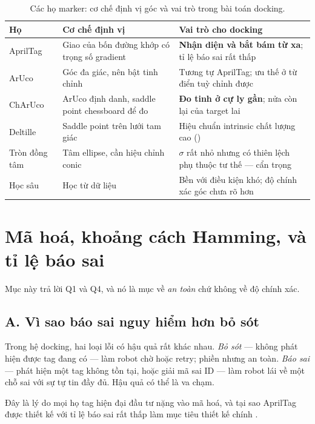 \documentclass[../../marker.tex]{subfiles}
\begin{document}
\begin{table}[H]\centering\small
\caption{Các họ marker: cơ chế định vị góc và vai trò trong bài toán docking.}
\label{tab:b07-ho}
\begin{tabularx}{\linewidth}{@{}L{2.2cm}L{3.6cm}Y@{}}
\toprule
\textbf{Họ} & \textbf{Cơ chế định vị} & \textbf{Vai trò cho docking}\\
\midrule
AprilTag & Giao của bốn đường khớp có trọng số gradient \cite{wang2016apriltag2} & \textbf{Nhận diện và bắt bám từ xa}; tỉ lệ báo sai rất thấp\\
ArUco & Góc đa giác, nên bật tinh chỉnh  & Tương tự AprilTag; ưu thế ở từ điển tuỳ chỉnh được \cite{garrido2016generation}\\
ChArUco & ArUco định danh, saddle point chessboard để đo & \textbf{Đo tinh ở cự ly gần}; nửa còn lại của target lai\\
Deltille \cite{chen2018deltille} & Saddle point trên lưới tam giác & Hiệu chuẩn intrinsic chất lượng cao ()\\
Tròn đồng tâm & Tâm ellipse, cần hiệu chỉnh conic & \(\sigma\) rất nhỏ nhưng có thiên lệch phụ thuộc tư thế --- cẩn trọng\\
Học sâu & Học từ dữ liệu & Bền với điều kiện khó; độ chính xác góc chưa rõ hơn\\
\bottomrule
\end{tabularx}
\end{table}

\section{Mã hoá, khoảng cách Hamming, và tỉ lệ báo sai}

Mục này trả lời Q1 và Q4, và nó là mục về \emph{an toàn} chứ không về độ chính xác.

\subsection{A. Vì sao báo sai nguy hiểm hơn bỏ sót}

Trong hệ docking, hai loại lỗi có hậu quả rất khác nhau. \emph{Bỏ sót} --- không phát hiện được tag đang có --- làm robot chờ hoặc retry; phiền nhưng an toàn. \emph{Báo sai} --- phát hiện một tag không tồn tại, hoặc giải mã sai ID --- làm robot lái về một chỗ sai với sự tự tin đầy đủ. Hậu quả có thể là va chạm.

Đây là lý do mọi họ tag hiện đại đầu tư nặng vào mã hoá, và tại sao AprilTag được thiết kế với tỉ lệ báo sai rất thấp làm mục tiêu thiết kế chính \cite{olson2011apriltag}.
\end{document}
